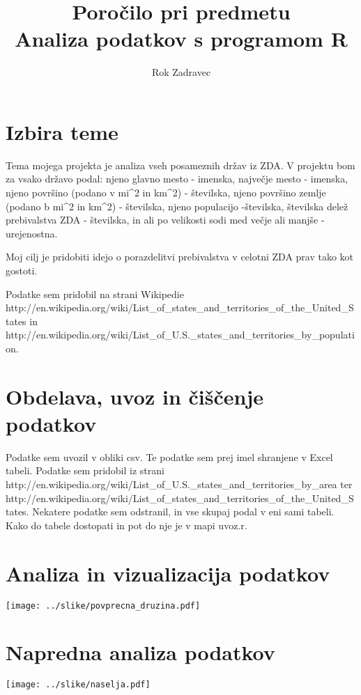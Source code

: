 \documentclass[11pt,a4paper]{article}
\begin{document}
\title{Poročilo pri predmetu \\
Analiza podatkov s programom R}
\author{Rok Zadravec}
\maketitle

\section{Izbira teme}

Tema mojega projekta je analiza vseh posameznih držav iz ZDA. V projektu bom za vsako državo podal: njeno glavno mesto - imenska, največje mesto - imenska, njeno površino (podano v mi^2 in km^2) - številska, njeno površino zemlje (podano b mi^2 in km^2) - številska, njeno populacijo -številska, številska delež prebivalstva ZDA  - številska, in ali po velikosti sodi med večje ali manjše - urejenostna.

Moj cilj je pridobiti idejo o porazdelitvi prebivalstva v celotni ZDA prav tako kot gostoti.

Podatke sem pridobil na strani Wikipedie http://en.wikipedia.org/wiki/List_of_states_and_territories_of_the_United_States in 
http://en.wikipedia.org/wiki/List_of_U.S._states_and_territories_by_population.


\section{Obdelava, uvoz in čiščenje podatkov}

Podatke sem uvozil v obliki csv. Te podatke sem prej imel shranjene v Excel tabeli. Podatke sem pridobil iz strani 
http://en.wikipedia.org/wiki/List_of_U.S._states_and_territories_by_area ter 
http://en.wikipedia.org/wiki/List_of_states_and_territories_of_the_United_States. Nekatere podatke sem odstranil, 
in vse skupaj podal v eni sami tabeli. Kako do tabele dostopati in pot do nje je v mapi uvoz.r.

\section{Analiza in vizualizacija podatkov}

\texttt{[image: ../slike/povprecna\_druzina.pdf]}

\section{Napredna analiza podatkov}

\texttt{[image: ../slike/naselja.pdf]}
\end{document}

